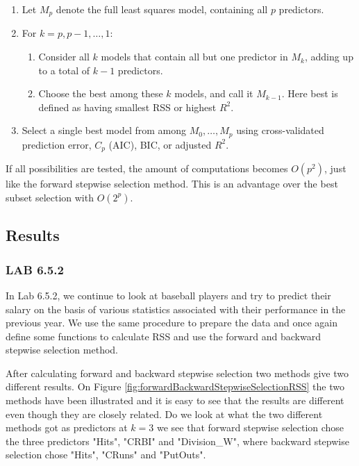 \begin{enumerate}
	\item Let $M_p$ denote the full least squares model, containing all $p$ predictors.
	\item For $k=p,p-1,\dots,1$:
	\begin{enumerate}
		\item Consider all $k$ models that contain all but one predictor in $M_k$, adding up to a total of $k-1$ predictors.
		\item Choose the best among these $k$ models, and call it $M_{k-1}$. Here best is defined as having smallest RSS or highest $R^2$.
	\end{enumerate}
	\item Select a single best model from among $M_0,\dots,M_p$ using cross-validated prediction error, $C_p$ (AIC), BIC, or adjusted $R^2$. 
\end{enumerate}

If all possibilities are tested, the amount of computations becomes $O(p^2)$, just like the forward stepwise selection method. This is an advantage over the best subset selection with $O(2^p)$.

\subsection{Results}
\subsubsection*{LAB 6.5.2}
In Lab 6.5.2, we continue to look at baseball players and try to predict their salary on the basis of various statistics associated with their performance in the previous year. We use the same procedure to prepare the data and once again define some functions to calculate RSS and use the forward and backward stepwise selection method.

After calculating forward and backward stepwise selection two methods give two different results. On Figure \ref{fig:forwardBackwardStepwiseSelectionRSS} the two methods have been illustrated and it is easy to see that the results are different even though they are closely related. Do we look at what the two different methods got as predictors at $k=3$ we see that forward stepwise selection chose the three predictors "Hits", "CRBI" and "Division\_W", where backward stepwise selection chose "Hits", "CRuns" and "PutOuts".

